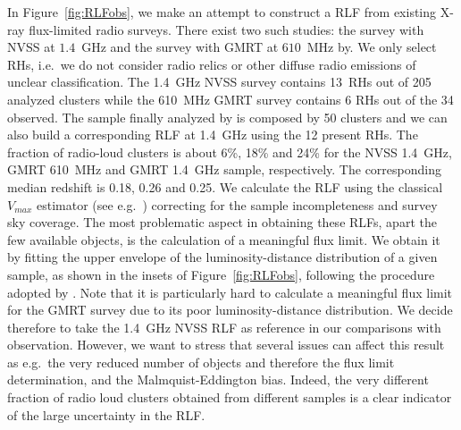 \documentclass[traditabstract]{aa}
\begin{document}
\begin{appendix}
In Figure~\ref{fig:RLFobs}, we make an attempt to construct a RLF from existing X-ray flux-limited radio surveys. There exist two such studies: the \cite{1999NewA....4..141G} survey with NVSS at $1.4$~GHz and the \cite{VenturiGMRT_1,VenturiGMRT_2} survey with GMRT at $610$~MHz by. We only select RHs, i.e.~we do not consider radio relics or other diffuse radio emissions of unclear classification. The 1.4~GHz NVSS survey contains 13~RHs out of 205 analyzed clusters while the 610~MHz GMRT survey contains 6 RHs out of the 34 observed. The sample finally analyzed by \cite{VenturiGMRT_1,VenturiGMRT_2} is composed by 50 clusters and we can also build a corresponding RLF at 1.4~GHz using the 12 present RHs. The fraction of radio-loud clusters is about 6\%, 18\% and 24\% for the NVSS 1.4~GHz, GMRT 610~MHz and GMRT 1.4~GHz sample, respectively. The corresponding median redshift is 0.18, 0.26 and 0.25. We calculate the RLF using the classical $V_{max}$ estimator (see e.g.~\citealp{1976ApJ...207..700F}) correcting for the sample incompleteness and survey sky coverage. The most problematic aspect in obtaining these RLFs, apart the few available objects, is the calculation of a meaningful flux limit. We obtain it by fitting the upper envelope of the luminosity-distance distribution of a given sample, as shown in the insets of Figure~\ref{fig:RLFobs}, following the procedure adopted by \cite{2011arXiv1106.5494B}. Note that it is particularly hard to calculate a meaningful flux limit for the GMRT survey due to its poor luminosity-distance distribution. We decide therefore to take the 1.4~GHz NVSS RLF as reference in our comparisons with observation. However, we want to stress that several issues can affect this result as e.g.~the very reduced number of objects and therefore the flux limit determination, and the Malmquist-Eddington bias. Indeed, the very different fraction of radio loud clusters obtained from different samples is a clear indicator of the large uncertainty in the RLF.


\end{appendix}
\end{document}
